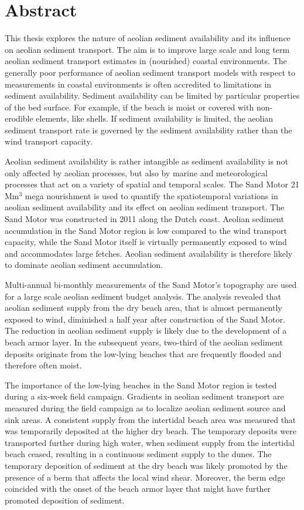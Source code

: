 \chapter*{Abstract}

This thesis explores the nature of aeolian sediment availability and
its influence on aeolian sediment transport. The aim is to improve
large scale and long term aeolian sediment transport estimates in
(nourished) coastal environments. The generally poor performance of
aeolian sediment transport models with respect to measurements in
coastal environments is often accredited to limitations in sediment
availability. Sediment availability can be limited by particular
properties of the bed surface. For example, if the beach is moist or
covered with non-erodible elements, like shells. If sediment
availability is limited, the aeolian sediment transport rate is
governed by the sediment availability rather than the wind transport
capacity.

Aeolian sediment availability is rather intangible as sediment
availability is not only affected by aeolian processes, but also by
marine and meteorological processes that act on a variety of spatial
and temporal scales. The Sand Motor 21 $\mathrm{Mm^3}$ mega
nourishment is used to quantify the spatiotemporal variations in
aeolian sediment availability and its effect on aeolian sediment
transport. The Sand Motor was constructed in 2011 along the Dutch
coast. Aeolian sediment accumulation in the Sand Motor region is low
compared to the wind transport capacity, while the Sand Motor itself
is virtually permanently exposed to wind and accommodates large
fetches. Aeolian sediment availability is therefore likely to dominate
aeolian sediment accumulation.

Multi-annual bi-monthly measurements of the Sand Motor's topography
are used for a large scale aeolian sediment budget analysis. The
analysis revealed that aeolian sediment supply from the dry beach
area, that is almost permanently exposed to wind, diminished a half
year after construction of the Sand Motor. The reduction in aeolian
sediment supply is likely due to the development of a beach armor
layer. In the subsequent years, two-third of the aeolian sediment
deposits originate from the low-lying beaches that are frequently
flooded and therefore often moist.

The importance of the low-lying beaches in the Sand Motor region is
tested during a six-week field campaign. Gradients in aeolian sediment
transport are measured during the field campaign as to localize
aeolian sediment source and sink areas. A consistent supply from the
intertidal beach area was measured that was temporarily deposited at
the higher dry beach. The temporary deposits were transported further
during high water, when sediment supply from the intertidal beach
ceased, resulting in a continuous sediment supply to the dunes. The
temporary deposition of sediment at the dry beach was likely promoted
by the presence of a berm that affects the local wind shear. Moreover,
the berm edge coincided with the onset of the beach armor layer that
might have further promoted deposition of sediment.

